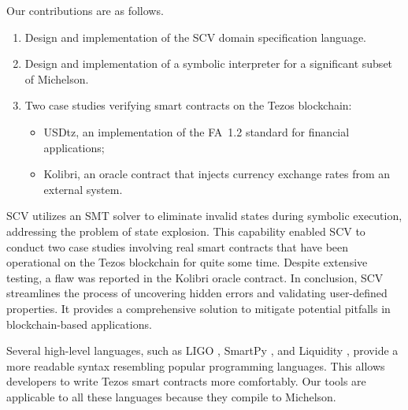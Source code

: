 \documentclass[runningheads]{llncs}
\begin{document}
Our contributions are as follows.
\begin{enumerate}
\item Design and implementation of the SCV domain specification language.
\item Design and implementation of a symbolic interpreter for a significant subset of Michelson. 
\item Two case studies verifying smart contracts on the Tezos blockchain:
  \begin{itemize}
  \item USDtz, an implementation of the FA~1.2 standard for financial applications;
  \item Kolibri, an oracle contract that injects currency exchange rates from an external system.
  \end{itemize}
\end{enumerate}

SCV utilizes an SMT solver to eliminate invalid states during symbolic execution, addressing the problem of state explosion. This capability enabled SCV to conduct two case studies involving real smart contracts that have been operational on the Tezos blockchain for quite some time. Despite extensive testing, a flaw was reported in the Kolibri oracle contract. In conclusion, SCV streamlines the process of uncovering hidden errors and validating user-defined properties. It provides a comprehensive solution to mitigate potential pitfalls in blockchain-based applications.

Several high-level languages, such as LIGO \cite{ligo}, SmartPy \cite{smartpy}, and Liquidity \cite{liquidity}, provide a more readable syntax resembling popular programming languages. This allows developers to write Tezos smart contracts more comfortably. Our tools are applicable to all these languages because they compile to Michelson.
\end{document}

